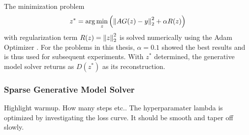 The minimization problem
\begin{equation}
    z^* = \arg\min_{z}{\left( \left\lVert A G(z) - y\right\rVert_2^2 + \alpha R(z) \right)}
\end{equation}
with regularization term $R(z) = \left\lVert z\right\rVert_2^2$ is solved numerically using the Adam Optimizer \parencite{Adam}.
For the problems in this thesis, $\alpha = 0.1$ showed the best results and is thus used for subsequent experiments.
With $z^*$ determined, the generative model solver returns as $D(z^*)$ as its reconstruction.

\subsubsection{Sparse Generative Model Solver}
Highlight warmup.
How many steps etc..
The hyperparamater lambda is optimized by investigating the loss curve.
It should be smooth and taper off slowly.
